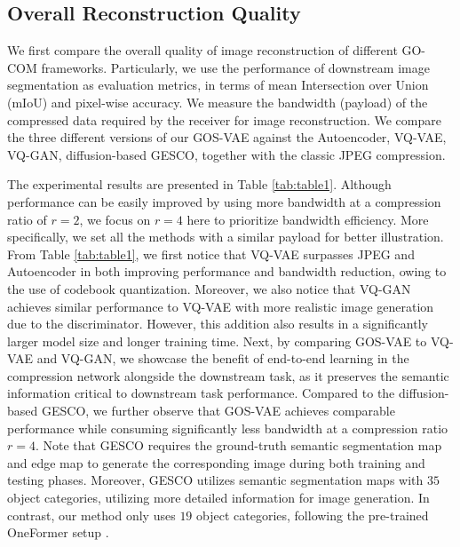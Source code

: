 \vspace{-1mm}
\subsection{Overall Reconstruction Quality}
\vspace{-1mm}
We first compare the overall quality of image reconstruction of different GO-COM frameworks. 
Particularly, we use the performance of downstream image segmentation as evaluation metrics, in
terms of mean Intersection over Union (mIoU) and pixel-wise accuracy. We measure the bandwidth (payload) of the compressed data required by the receiver for image reconstruction. 
We compare the three different versions of our GOS-VAE against the Autoencoder, VQ-VAE, VQ-GAN, diffusion-based GESCO, together
with the classic JPEG compression.

The experimental results 
are presented in Table \ref{tab:table1}. Although performance can be easily improved by using more bandwidth at a compression ratio of $r=2$, we focus on $r=4$ here to prioritize bandwidth efficiency. 
More specifically, we set all the methods with a similar payload for better illustration.
From Table \ref{tab:table1}, we first notice that VQ-VAE surpasses JPEG and Autoencoder in both improving performance and bandwidth reduction,
owing to the use of codebook quantization. Moreover, we also notice that VQ-GAN achieves similar performance to VQ-VAE with more realistic image generation due to the discriminator. However, this addition also results in a significantly larger model size and longer training time. Next, by comparing GOS-VAE to VQ-VAE and VQ-GAN, we showcase the benefit of end-to-end learning in the compression network alongside the downstream task, as it preserves the semantic information critical to downstream task performance. Compared to the diffusion-based GESCO, we further observe that GOS-VAE achieves comparable performance while consuming significantly less bandwidth at a compression ratio $r=4$. Note that GESCO requires the ground-truth semantic segmentation map and edge map 
to generate the corresponding image during both training and testing phases. Moreover, GESCO utilizes semantic segmentation maps with $35$ object categories, utilizing more detailed information for image generation. In contrast, our method only uses $19$ object categories, following the pre-trained OneFormer setup \cite{jain2023oneformer}. 





